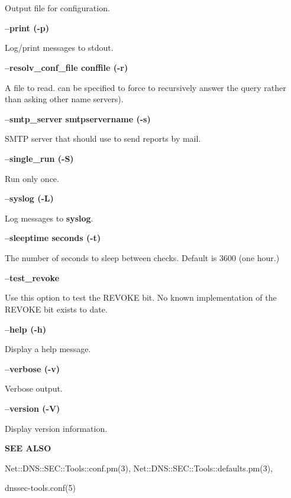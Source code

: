 \begin{description}
Output file for configuration.

\item {\bf --print (-p)}\verb" "

Log/print messages to stdout.

\item {\bf --resolv\_conf\_file conffile (-r)}\verb" "

A  file to read.   can be specified to force
 to recursively answer the query rather than asking other name
servers).

\item {\bf --smtp\_server smtpservername (-s)}\verb" "

SMTP server that  should use to send reports by mail.

\item {\bf --single\_run (-S)}\verb" "

Run only once.

\item {\bf --syslog (-L)}\verb" "

Log messages to {\bf syslog}.

\item {\bf --sleeptime seconds (-t)}\verb" "

The number of seconds to sleep between checks. Default is 3600 (one hour.)

\item {\bf --test\_revoke}\verb" "

Use this option to test the REVOKE bit. No known implementation of
the REVOKE bit exists to date.

\item {\bf --help (-h)}\verb" "

Display a help message.

\item {\bf --verbose (-v)}\verb" "

Verbose output.

\item {\bf --version (-V)}\verb" "

Display version information.

\end{description}

{\bf SEE ALSO}

Net::DNS::SEC::Tools::conf.pm(3),
Net::DNS::SEC::Tools::defaults.pm(3),

dnssec-tools.conf(5)


